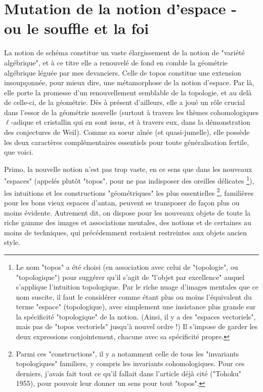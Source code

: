 \section{Mutation de la notion d'espace - ou le souffle et la foi}

La notion de schéma constitue un vaste élargissement de la notion de "variété algébrique", et à ce titre elle a renouvelé de fond en comble la géométrie algébrique léguée par mes devanciers. Celle de topos constitue une extension insoupçonnée, pour mieux dire, une métamorphose de la notion d'espace. Par là, elle porte la promesse d'un renouvellement semblable de la topologie, et au delà de celle-ci, de la géométrie. Dès à présent d'ailleurs, elle a joué un rôle crucial dans l'essor de la géométrie nouvelle (surtout à travers les thèmes cohomologiques $\ell$-adique et cristallin qui en sont issus, et à travers eux, dans la démonstration des conjectures de Weil). Comme sa soeur aînée (et quasi-jumelle), elle possède les deux caractères complémentaires essentiels pour toute généralisation fertile, que voici.

Primo, la nouvelle notion n'est pas trop vaste, en ce sens que dans les nouveaux "espaces" (appelés plutôt "topos", pour ne pas indisposer des oreilles délicates \footnote{Le nom "topos" a été choisi (en association avec celui de "topologie", ou "topologique") pour suggérer qu'il s'agit de "l'objet par excellence" auquel s'applique l'intuition topologique. Par le riche nuage d'images mentales que ce nom suscite, il faut le considérer comme étant plus ou moins l'équivalent du terme "espace" (topologique), avec simplement une insistance plus grande sur la spécificité "topologique" de la notion. (Ainsi, il y a des "espaces vectoriels", mais pas de "topos vectoriels" jusqu'à nouvel ordre !) Il s'impose de garder les deux expressions conjointement, chacune avec sa spécificité propre.}), les intuitions et les constructions "géométriques" les plus essentielles \footnote{Parmi ces "constructions", il y a notamment celle de tous les "invariants topologiques" familiers, y compris les invariants cohomologiques. Pour ces derniers, j’avais fait tout ce qu’il fallait dans l’article déjà cité ("Tohoku" 1955), pour pouvoir leur donner un sens pour tout "topos".}, familières pour les bons vieux espaces d'antan, peuvent se transposer de façon plus ou moins évidente. Autrement dit, on dispose pour les nouveaux objets de toute la riche gamme des images et associations mentales, des notions et de certaines au moins de techniques, qui précédemment restaient restreintes aux objets ancien style.

